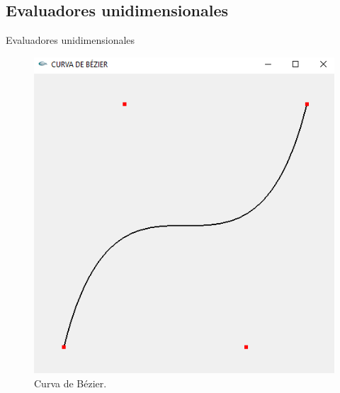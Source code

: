 \documentclass[10.5pt]{beamer}
\begin{document}
\subsection{Evaluadores unidimensionales}

\begin{frame}{Evaluadores unidimensionales}

\begin{figure}[h]
	\centering
	\includegraphics[width=0.5\linewidth]{figura/CURVA.PNG}
	\caption{Curva de Bézier.}
	\label{fig:propuesta}
\end{figure}

\end{frame}
\end{document}
